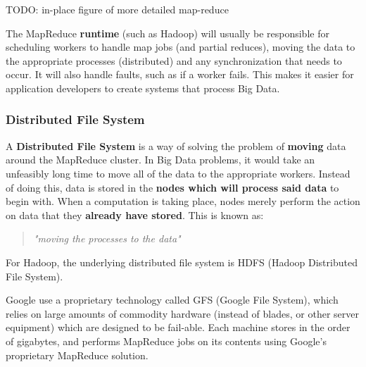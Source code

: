 \documentclass{article}
\begin{document}
TODO: in-place figure of more detailed map-reduce

The MapReduce \textbf{runtime} (such as Hadoop) will usually be responsible for scheduling workers to handle map jobs (and partial reduces), moving the data to the appropriate processes (distributed) and any synchronization that needs to occur. It will also handle faults, such as if a worker fails. This makes it easier for application developers to create systems that process Big Data.

\subsubsection{Distributed File System}

A \textbf{Distributed File System} is a way of solving the problem of \textbf{moving} data around the MapReduce cluster. In Big Data problems, it would take an unfeasibly long time to move all of the data to the appropriate workers. Instead of doing this, data is stored in the \textbf{nodes which will process said data} to begin with. When a computation is taking place, nodes merely perform the action on data that they \textbf{already have stored}. This is known as:
\begin{quote}
	\textit{"moving the processes to the data"}
\end{quote} 

For Hadoop, the underlying distributed file system is HDFS (Hadoop Distributed File System). 

Google use a proprietary technology called GFS (Google File System), which relies on large amounts of commodity hardware (instead of blades, or other server equipment) which are designed to be fail-able. Each machine stores in the order of gigabytes, and performs MapReduce jobs on its contents using Google's proprietary MapReduce solution.
\end{document}
